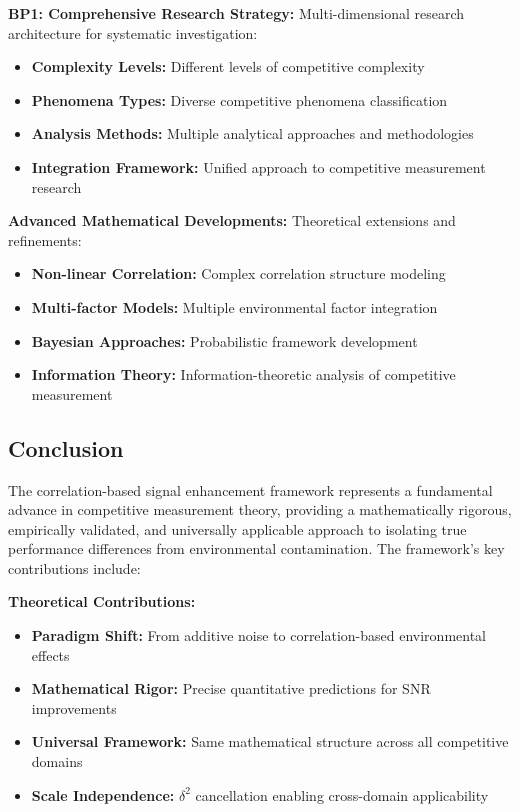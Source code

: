 \textbf{BP1: Comprehensive Research Strategy:}
Multi-dimensional research architecture for systematic investigation:
\begin{itemize}
    \item \textbf{Complexity Levels:} Different levels of competitive complexity
    \item \textbf{Phenomena Types:} Diverse competitive phenomena classification
    \item \textbf{Analysis Methods:} Multiple analytical approaches and methodologies
    \item \textbf{Integration Framework:} Unified approach to competitive measurement research
\end{itemize}

\textbf{Advanced Mathematical Developments:}
Theoretical extensions and refinements:
\begin{itemize}
    \item \textbf{Non-linear Correlation:} Complex correlation structure modeling
    \item \textbf{Multi-factor Models:} Multiple environmental factor integration
    \item \textbf{Bayesian Approaches:} Probabilistic framework development
    \item \textbf{Information Theory:} Information-theoretic analysis of competitive measurement
\end{itemize}

\subsection{Conclusion}

The correlation-based signal enhancement framework represents a fundamental advance in competitive measurement theory, providing a mathematically rigorous, empirically validated, and universally applicable approach to isolating true performance differences from environmental contamination. The framework's key contributions include:

\textbf{Theoretical Contributions:}
\begin{itemize}
    \item \textbf{Paradigm Shift:} From additive noise to correlation-based environmental effects
    \item \textbf{Mathematical Rigor:} Precise quantitative predictions for SNR improvements
    \item \textbf{Universal Framework:} Same mathematical structure across all competitive domains
    \item \textbf{Scale Independence:} $\delta^2$ cancellation enabling cross-domain applicability
\end{itemize}


